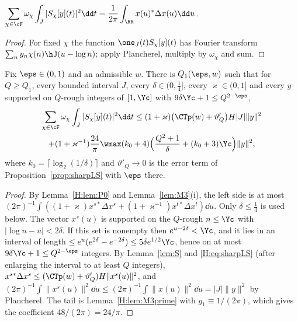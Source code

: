 \begin{lemma}\label{H:lem:P0}
$\displaystyle\sum_{\chi\in\cF}\omega_\chi\int_J|S_\chi[y](t)|^2\dd t=\frac1{2\pi}\int_\RR x(u)^*\Delta x(u)\dd u$.
\end{lemma}
\begin{proof}
For fixed $\chi$ the function $\one_J(t)S_\chi[y](t)$ has Fourier transform $\sum_ny_n\chi(n)\hJ(u-\log n)$; apply Plancherel, multiply by $\omega_\chi$ and sum.
\end{proof}

\begin{theorem}\label{H:thm:SH}
Fix $\eps\in(0,1)$ and an admissible $w$. There is $Q_1(\eps,w)$ such that for $Q\ge Q_1$, every bounded interval $J$, every $\delta\in(0,\frac14]$, every $\varkappa\in(0,1]$ and every $y$ supported on $Q$-rough integers of $[1,\Yc]$ with $9\delta\Yc+1\le Q^{2-\eps}$,
\begin{multline*}
\sum_{\chi\in\cF}\omega_\chi\int_J|S_\chi[y](t)|^2\dd t\le(1+\varkappa)\big(\CTp(w)+\vartheta'_Q\big)H|J|\|y\|^2\\
+(1+\varkappa^{-1})\frac{24}\pi\wmax(k_0+4)\Big(\frac{Q^2+1}\delta+(k_0+3)\Yc\Big)\|y\|^2,
\end{multline*}
where $k_0=\lceil\log_2(1/\delta)\rceil$ and $\vartheta'_Q\to0$ is the error term of Proposition~\ref{prop:sharpLS} with $\eps$ there.
\end{theorem}
\begin{proof}
By Lemma~\ref{H:lem:P0} and Lemma~\ref{lem:M3}(i), the left side is at most $(2\pi)^{-1}\int((1+\varkappa)x^{s*}\Delta x^s+(1+\varkappa^{-1})x^{t*}\Delta x^t)\dd u$. Only $\delta\le\frac14$ is used below. The vector $x^s(u)$ is supported on the $Q$-rough $n\le\Yc$ with $|\log n-u|<2\delta$. If this set is nonempty then $e^{u-2\delta}<\Yc$, and it lies in an interval of length $\le e^u(e^{2\delta}-e^{-2\delta})\le5\delta e^{1/2}\Yc$, hence on at most $9\delta\Yc+1\le Q^{2-\eps}$ integers. By Lemma~\ref{lem:S} and \eqref{H:eq:sharpLS} (after enlarging the interval to at least $Q$ integers), $x^{s*}\Delta x^s\le(\CTp(w)+\vartheta'_Q)H\|x^s(u)\|^2$, and $(2\pi)^{-1}\int\|x^s(u)\|^2\dd u\le(2\pi)^{-1}\int\|x(u)\|^2\dd u=|J|\|y\|^2$ by Plancherel. The tail is Lemma~\ref{H:lem:M3prime} with $g_1\equiv1/(2\pi)$, which gives the coefficient $48/(2\pi)=24/\pi$.
\end{proof}

